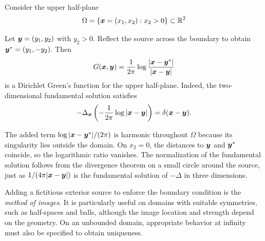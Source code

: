 \begin{example}
Consider the upper half-plane
\[
\Omega=\{\bm{x}=(x_1,x_2):x_2>0\}\subset\mathbb{R}^2
\]

Let $\bm{y}=(y_1,y_2)$ with $y_2>0$. Reflect the source across the boundary to obtain $\bm{y}^*=(y_1,-y_2)$. Then
\begin{equation}
G(\bm{x},\bm{y})=\frac{1}{2\pi}\log\frac{|\bm{x}-\bm{y}^*|}{|\bm{x}-\bm{y}|}
\end{equation}
is a Dirichlet Green's function for the upper half-plane. Indeed, the two-dimensional fundamental solution satisfies
\[
-\Delta_{\bm{x}}\left(-\frac{1}{2\pi}\log|\bm{x}-\bm{y}|\right)=\delta(\bm{x}-\bm{y}).
\]

The added term $\log|\bm{x}-\bm{y}^*|/(2\pi)$ is harmonic throughout $\Omega$ because its singularity lies outside the domain. On $x_2=0$, the distances to $\bm{y}$ and $\bm{y}^*$ coincide, so the logarithmic ratio vanishes. The normalization of the fundamental solution follows from the divergence theorem on a small circle around the source, just as $1/(4\pi|\bm{x}-\bm{y}|)$ is the fundamental solution of $-\Delta$ in three dimensions.

Adding a fictitious exterior source to enforce the boundary condition is the \emph{method of images}. It is particularly useful on domains with suitable symmetries, such as half-spaces and balls, although the image location and strength depend on the geometry. On an unbounded domain, appropriate behavior at infinity must also be specified to obtain uniqueness.
\end{example}